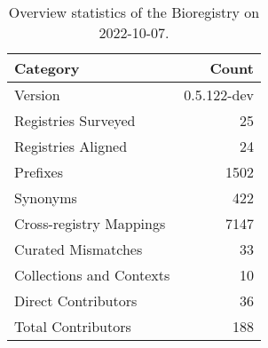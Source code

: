 \begin{table}
\centering
\caption{Overview statistics of the Bioregistry on 2022-10-07.}
\label{tab:bioregistry-summary}
\begin{tabular}{lr}
\toprule
                Category &       Count \\
\midrule
                 Version & 0.5.122-dev \\
     Registries Surveyed &          25 \\
      Registries Aligned &          24 \\
                Prefixes &        1502 \\
                Synonyms &         422 \\
 Cross-registry Mappings &        7147 \\
      Curated Mismatches &          33 \\
Collections and Contexts &          10 \\
     Direct Contributors &          36 \\
      Total Contributors &         188 \\
\bottomrule
\end{tabular}
\end{table}
